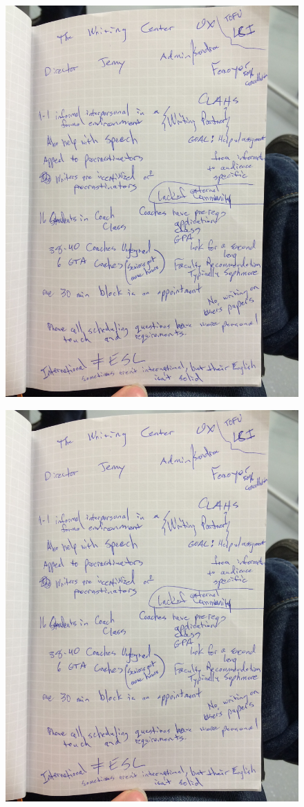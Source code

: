 \documentclass[12pt]{article} %
\begin{document}
  \begin{figure}[H]
  \centering
  \includegraphics[width=0.75\linewidth]{special-raw-notes}
  \caption{}
  \label{fig:rn12}
  \end{figure}
  \begin{figure}[H]
  \centering
  \includegraphics[width=0.75\linewidth]{"raw notes researcher3"}
  \caption{}
  \label{fig:rn13}
  \end{figure}
\end{document}
